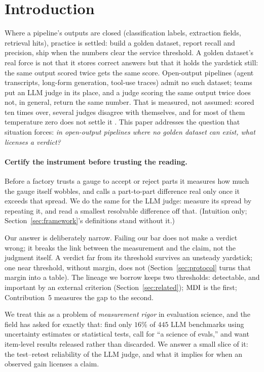 \section{Introduction}
\label{sec:introduction}

Where a pipeline's outputs are closed (classification labels, extraction
fields, retrieval hits), practice is settled: build a golden dataset, report
recall and precision, ship when the numbers clear the service threshold. A
golden dataset's real force is not that it stores correct answers but that it
holds the yardstick still: the same output scored twice gets the same
score. Open-output pipelines (agent transcripts, long-form generation, tool-use
traces) admit no such dataset; teams put an LLM judge in its place, and a judge
scoring the same output twice does not, in general, return the same number.
That is measured, not assumed: scored ten times over, several judges disagree
with themselves, and for most of them temperature zero does not settle it
\citep{lau2026sameinput}. This paper addresses the question that situation
forces: \emph{in open-output pipelines where no golden dataset can exist, what
licenses a verdict?}

\paragraph{Certify the instrument before trusting the reading.}
Before a factory trusts a gauge to accept or reject parts it measures how much
the gauge itself wobbles, and calls a part-to-part difference real only once it
exceeds that spread. We do the same for the LLM judge: measure its spread by
repeating it, and read a smallest resolvable difference off that. (Intuition
only; Section~\ref{sec:framework}'s definitions stand without it.)

Our answer is deliberately narrow. Failing our bar does not make a verdict
wrong; it breaks the link between the measurement and the claim, not the
judgment itself. A verdict far from its threshold survives an unsteady
yardstick; one near threshold, without margin, does not
(Section~\ref{sec:protocol} turns that margin into a table).
The lineage we borrow keeps two thresholds: detectable, and important
by an external criterion (Section~\ref{sec:related}); $\mathrm{MDI}$ is the first;
Contribution~5 measures the gap to the second.

We treat this as a problem of \emph{measurement rigor} in evaluation science,
and the field has asked for exactly that: \citet{bean2025construct} find only
$16\%$ of $445$ LLM benchmarks using uncertainty estimates or statistical
tests, \citet{apollo2024science} call for ``a science of evals,'' and
\citet{jiang2026itemlevel} want item-level results released rather than
discarded. We answer a small slice of it: the test--retest reliability of the
LLM judge, and what it implies for when an observed gain licenses a claim.

